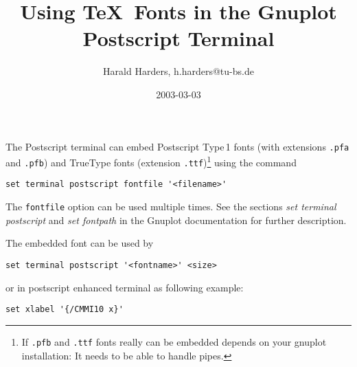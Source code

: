 \documentclass[a4paper,10pt]{article}
\begin{document}
\title{Using \TeX\ Fonts in the Gnuplot Postscript Terminal}
\author{Harald Harders, {\ttfamily h.harders@tu-bs.de}}
\date{2003-03-03}
\maketitle

\noindent
The Postscript terminal can embed Postscript Type\,1 fonts (with
extensions \verb|.pfa| and \verb|.pfb|) and TrueType fonts (extension
\verb|.ttf|)\footnote{If \texttt{.pfb} and \texttt{.ttf} fonts really
  can be embedded depends on your gnuplot installation: It needs to be
  able to handle pipes.} using the command
\begin{verbatim}
set terminal postscript fontfile '<filename>'
\end{verbatim}
The \verb|fontfile| option can be used multiple times.
See the sections \emph{set terminal postscript} and \emph{set
  fontpath} in the Gnuplot documentation for further description.

The embedded font can be used by 
\begin{verbatim}
set terminal postscript '<fontname>' <size>
\end{verbatim}
or in postscript enhanced terminal as following example:
\begin{verbatim}
set xlabel '{/CMMI10 x}'
\end{verbatim}
\end{document}
